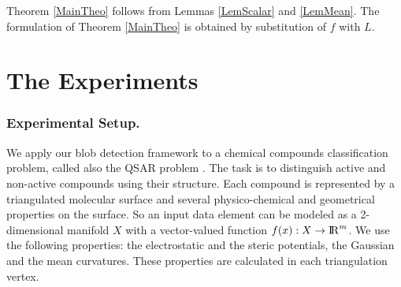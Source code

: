 \documentclass{llncs}
\begin{document}
Theorem \ref{MainTheo} follows from Lemmas \ref{LemScalar} and \ref{LemMean}. The formulation of Theorem \ref{MainTheo} is obtained by substitution of $f$ with $L$.

\section{The Experiments}
\subsubsection{Experimental Setup.}
We apply our blob detection framework to a chemical compounds classification problem, called also the QSAR problem \cite{qsar}. The task is to distinguish active and non-active compounds using their structure. Each compound is represented by a triangulated molecular surface \cite{molecular} and several physico-chemical and geometrical properties on the surface. So an input data element can be modeled as a 2-dimensional manifold $X$ with a vector-valued function $f(x):X \to {\rm I\!R}^m$. We use the following properties: the electrostatic and the steric potentials, the Gaussian and the mean curvatures. These properties are calculated in each triangulation vertex.
\end{document}
